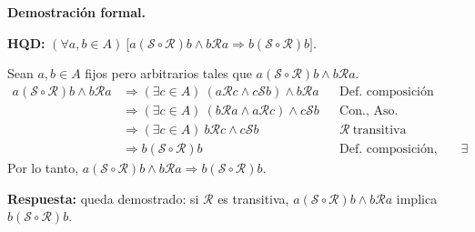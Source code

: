 \documentclass[11pt]{article}
\begin{document}
\textbf{Demostración formal.}

\textbf{HQD:} $(\forall a,b\in A)\ \big[a(\mathcal S\circ\mathcal R)b\wedge b\mathcal Ra\Rightarrow b(\mathcal S\circ\mathcal R)b\big]$.

Sean $a,b\in A$ fijos pero arbitrarios tales que $a(\mathcal S\circ\mathcal R)b\wedge b\mathcal Ra$.
\begin{align*}
a(\mathcal S\circ\mathcal R)b\wedge b\mathcal Ra&\Rightarrow(\exists c\in A)\ (a\mathcal Rc\wedge c\mathcal Sb)\wedge b\mathcal Ra && \text{Def. composición}\\
&\Rightarrow(\exists c\in A)\ (b\mathcal Ra\wedge a\mathcal Rc)\wedge c\mathcal Sb && \text{Con., Aso.}\\
&\Rightarrow(\exists c\in A)\ b\mathcal Rc\wedge c\mathcal Sb && \mathcal R\ \text{transitiva}\\
&\Rightarrow b(\mathcal S\circ\mathcal R)b && \text{Def. composición, Intro. }\exists
\end{align*}
Por lo tanto, $a(\mathcal S\circ\mathcal R)b\wedge b\mathcal Ra\Rightarrow b(\mathcal S\circ\mathcal R)b$.

\textbf{Respuesta:} queda demostrado: si $\mathcal R$ es transitiva, $a(\mathcal S\circ\mathcal R)b\wedge b\mathcal Ra$ implica $b(\mathcal S\circ\mathcal R)b$.
\end{document}
